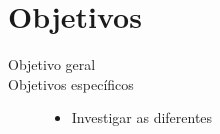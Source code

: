 \section{Objetivos}\label{OBJ}

\begin{description}
	\item[Objetivo geral] 
	\item[Objetivos específicos] 
	\begin{itemize}
		\item Investigar as diferentes 
	\end{itemize}
\end{description}



